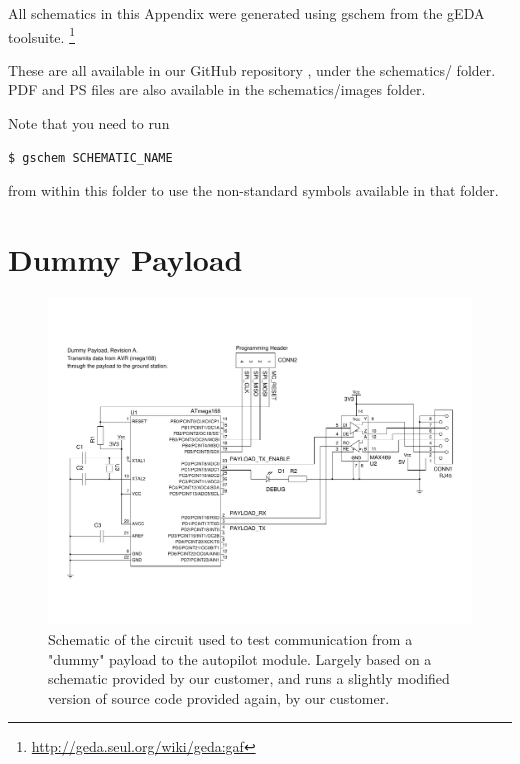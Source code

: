 \label{appendix_schematics}

All schematics in this Appendix were generated using gschem from the gEDA 
toolsuite. \footnote{\url{http://geda.seul.org/wiki/geda:gaf}}

These are all available in our GitHub repository \cite{github}, under the 
schematics/ folder. PDF and PS files are also available in the 
schematics/images folder.

Note that you need to run 
\begin{verbatim} 
$ gschem SCHEMATIC_NAME
\end{verbatim}
from within this folder to use the non-standard symbols available in that 
folder.

\section{Dummy Payload}
\begin{figure}[H]
\includegraphics[width=1.4\textwidth, angle=90]{schematics/dummy_payload.pdf}
\caption{Schematic of the circuit used to test communication from a "dummy" 
payload to the autopilot module. Largely based on a schematic provided by 
our customer, and runs a slightly modified version of source code provided 
again, by our customer.}
\end{figure}

